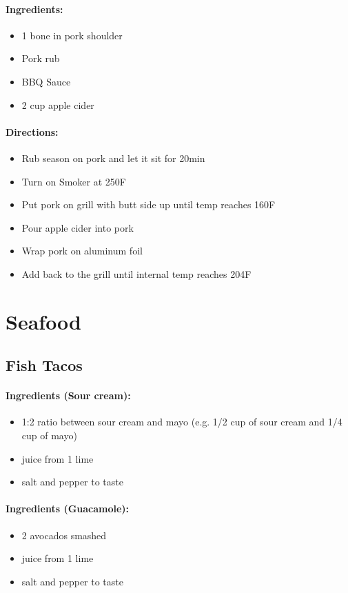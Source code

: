 \documentclass{article}
\begin{document}
\paragraph{Ingredients:}

\begin{itemize}
	\item 1 bone in pork shoulder
	\item Pork rub
	\item BBQ Sauce
	\item 2 cup apple cider
\end{itemize}

\paragraph{Directions:}
\begin{itemize}
	\item Rub season on pork and let it sit for 20min
	\item Turn on Smoker at 250F
	\item Put pork on grill with butt side up until temp reaches 160F
	\item Pour apple cider into pork
	\item Wrap pork on aluminum foil
	\item Add back to the grill until internal temp reaches 204F
\end{itemize}

\section{Seafood}

\subsection{Fish Tacos}{}

\paragraph{Ingredients (Sour cream):}
\begin{itemize}
	\item 1:2 ratio between sour cream and mayo (e.g. 1/2 cup of sour cream and 1/4 cup of mayo)
	\item juice from 1 lime
	\item salt and pepper to taste
\end{itemize}

\paragraph{Ingredients (Guacamole):}
\begin{itemize}
	\item 2 avocados smashed
	\item juice from 1 lime
	\item salt and pepper to taste
\end{itemize}
\end{document}
